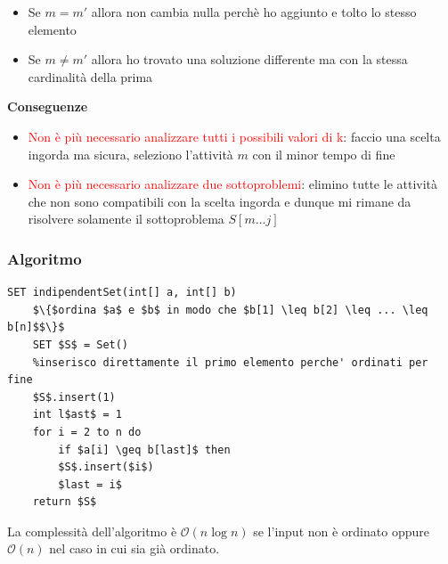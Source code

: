 \documentclass[../cheatSheetAlgoritmi.tex]{subfiles}
\begin{document}
\begin{itemize}
	\item Se $m = m'$ allora non cambia nulla perchè ho aggiunto e tolto lo stesso elemento
	\item Se $m \neq m'$ allora ho trovato una soluzione differente ma con la stessa cardinalità della prima 
\end{itemize}
\textbf{Conseguenze}\\
\begin{itemize}
	\item \textcolor{red}{Non è più necessario analizzare tutti i possibili valori di k}: faccio una scelta ingorda ma sicura, seleziono l'attività $m$ con il minor tempo di fine
	\item \textcolor{red}{Non è più necessario analizzare due sottoproblemi}: elimino tutte le attività che non sono compatibili con la scelta ingorda e dunque mi rimane da risolvere solamente il sottoproblema $S[m...j]$
\end{itemize}
\subsubsection{Algoritmo}
\begin{lstlisting}[caption=indipendent Set (Greedy)]
SET indipendentSet(int[] a, int[] b)
	$\{$ordina $a$ e $b$ in modo che $b[1] \leq b[2] \leq ... \leq b[n]$$\}$
	SET $S$ = Set()
	%inserisco direttamente il primo elemento perche' ordinati per fine
	$S$.insert(1) 
	int l$ast$ = 1
	for i = 2 to n do
		if $a[i] \geq b[last]$ then
		$S$.insert($i$)
		$last = i$
	return $S$
\end{lstlisting}
La complessità dell'algoritmo è $\mathcal{O}(n\log{n})$ se l'input non è ordinato oppure $\mathcal{O}(n)$ nel caso in cui sia già ordinato.
\end{document}

